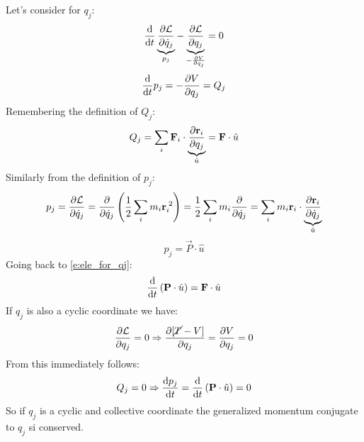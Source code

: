 Let's consider \eleref\;for $q_j$:
\begin{equation}
    \dv{}{t}\underbrace{\pdv{\lagr}{\dot{q}_j}}_{p_j} - \underbrace{\pdv{\lagr}{q_j}}_{-\frac{ \partial V}{\partial q_j}} = 0
\end{equation}
\begin{equation} \label{e:ele_for_qj}
    \dv{}{t}p_j = -\pdv{V}{q_j} = Q_j
\end{equation}
Remembering the definition of $Q_j$:
\begin{equation}
    Q_j = \bigsum_i \vec{F}_i \cdot \underbrace{\pdv{\vec{r}_i}{q_j}}_{\hat{u}} = \vec{F}\cdot \hat{u}
\end{equation}
Similarly from the definition of $p_j$:
\begin{equation}
    p_j = \pdv{\lagr}{\dot{q}_j} = \pdv{}{\dot{q}_j}\brackets{\dfrac{1}{2}\bigsum_i m_i \vec{r}_i^{\;2}} = \dfrac{1}{2}\bigsum_i m_i \pdv{}{\dot{q}_j}(\vec{r}_i^2) = \bigsum_i m_i \vec{r}_i \cdot \underbrace{\pdv{\vec{r}_i}{\dot{q}_j}}_{\hat{u}}
\end{equation}
\begin{equation}
    p_j = \vec{P}\cdot\hat{u}
\end{equation}
Going back to \eqref{e:ele_for_qj}:
\begin{equation}
    \dv{}{t} \brackets{\vec{P} \cdot \hat{u}} = \vec{F}\cdot \hat{u}
\end{equation}
If $q_j$ is also a cyclic coordinate we have:
\begin{equation}
    \pdv{\lagr}{q_j} = 0 \Rightarrow \pdv{[\cancel{T}-V]}{q_j} = \pdv{V}{q_j} = 0
\end{equation}
From this immediately follows:
\begin{equation}
    Q_j = 0 \Rightarrow \dv{p_j}{t} = \dv{}{t} \brackets{\vec{P}\cdot\hat{u}} = 0
\end{equation}
So if $q_j$ is a cyclic and collective coordinate the generalized momentum conjugate to $q_j$ si conserved.
